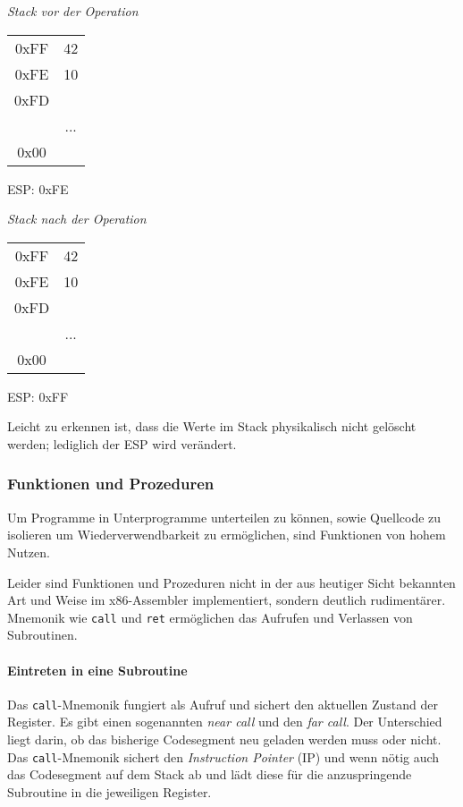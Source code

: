\begin{multicols}{2}

\begin{minipage}{5cm}
\emph{Stack vor der Operation}
\begin{tabular}{c|c|}
    \cline{2-2}
   0xFF & 42\\ \cline{2-2}
   0xFE & 10\\ \cline{2-2}
   0xFD & \\ \cline{2-2}
          & ... \\ \cline{2-2}
     0x00 & \\ \cline{2-2}
\end{tabular}
ESP: 0xFE
\end{minipage}

\begin{minipage}{5cm}
\emph{Stack nach der Operation}
\begin{tabular}{c|c|}
    \cline{2-2}
   0xFF & 42    \\ \cline{2-2}
   0xFE & 10    \\ \cline{2-2}
   0xFD &       \\ \cline{2-2}
        & ...   \\ \cline{2-2}
   0x00 &       \\ \cline{2-2}
\end{tabular}
ESP: 0xFF
\end{minipage}
\end{multicols}

Leicht zu erkennen ist, dass die Werte im Stack physikalisch nicht gelöscht werden; lediglich der ESP wird verändert.

\subsubsection{Funktionen und Prozeduren}

Um Programme in Unterprogramme unterteilen zu können, sowie Quellcode zu isolieren um Wiederverwendbarkeit zu ermöglichen, sind Funktionen von hohem Nutzen.\cite[S. 179]{intelmanual}

Leider sind Funktionen und Prozeduren nicht in der aus heutiger Sicht bekannten Art und Weise im x86-Assembler implementiert, sondern deutlich rudimentärer.
Mnemonik wie \texttt{call} und \texttt{ret} ermöglichen das Aufrufen und Verlassen von Subroutinen.

\paragraph{Eintreten in eine Subroutine}
Das \texttt{call}-Mnemonik fungiert als Aufruf und sichert den aktuellen Zustand der Register.
Es gibt einen sogenannten \textit{near call} und den \textit{far call}.
Der Unterschied liegt darin, ob das bisherige Codesegment neu geladen werden muss oder nicht.
Das \texttt{call}-Mnemonik sichert den \textit{Instruction Pointer} (IP) und wenn nötig auch das Codesegment auf dem Stack ab und lädt diese für die anzuspringende Subroutine in die jeweiligen Register.

